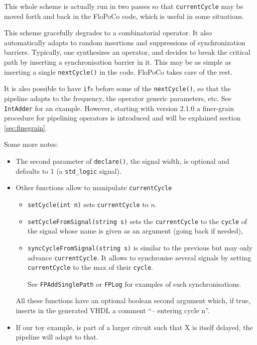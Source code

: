 \documentclass{article}
\begin{document}
This whole scheme is actually run in two passes so that
\verb!currentCycle! may be moved forth and back in the FloPoCo code, which is useful in some situations.

This scheme gracefully degrades to a
combinatorial operator. It also automatically adapts to random
insertions and suppressions of synchronization barriers. Typically,
one synthesizes an operator, and decides to break the critical path by
inserting a synchronisation barrier in it. This may be as simple as
inserting a single \verb!nextCycle()! in the code. FloPoCo takes care of the rest.

It is also possible to have \verb!if!s before some of the
\verb!nextCycle()!, so that the pipeline adapts to the frequency, the
operator generic parameters, etc. See \verb!IntAdder! for an example.
However, starting with version 2.1.0 a finer-grain procedure for pipelining 
operators is introduced and will be explained section \ref{sec:finegrain}.

Some more notes:
\begin{itemize}
\item The second parameter of \verb!declare()!, the signal width, is
  optional and defaults to 1 (a \verb!std_logic! signal).

\item Other functions allow to manipulate \verb!currentCycle!
  \begin{itemize}
  \item 
    \verb!setCycle(int n)! sets \verb!currentCycle! to  $n$.  
  \item \verb!setCycleFromSignal(string s)!  
    sets the \verb!currentCycle! to the \verb!cycle! of the signal
    whose name is given as an argument (going back if needed),
  \item 
    \verb!syncCycleFromSignal(string s)! is similar to the previous but may only advance
    \verb!currentCycle!. It allows to synchronise several
    signals by setting \verb!currentCycle! to the max of their
    \verb!cycle!.

See \verb!FPAddSinglePath! or \verb!FPLog! for examples of
  such synchronisations. 
  \end{itemize}

All these functions have an optional boolean
  second argument which, if true, inserts in the generated VHDL a
  comment ``-- entering cycle n''.


\item If our toy example, is part of a larger circuit such that X is
  itself delayed, the pipeline will adapt to that.

\end{itemize}
\end{document}
